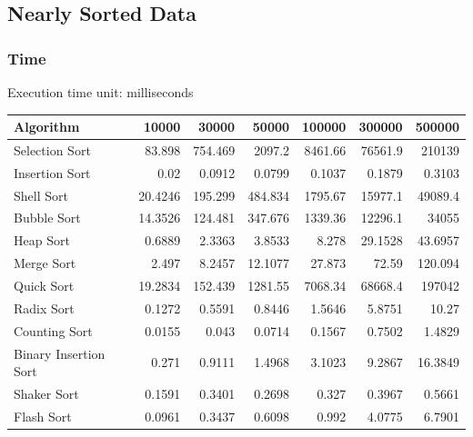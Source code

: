 \subsection{Nearly Sorted Data}
\subsubsection{Time}
Execution time unit: milliseconds
\begin{table}[h!]
\centering
\begin{tabular}{|l|r|r|r|r|r|r|}
\hline
\textbf{Algorithm} & \textbf{10000} & \textbf{30000} & \textbf{50000} & \textbf{100000} & \textbf{300000} & \textbf{500000} \\
\hline
Selection Sort & 83.898 & 754.469 & 2097.2 & 8461.66 & 76561.9 & 210139 \\ \hline
Insertion Sort & 0.02 & 0.0912 & 0.0799 & 0.1037 & 0.1879 & 0.3103 \\ \hline
Shell Sort & 20.4246 & 195.299 & 484.834 & 1795.67 & 15977.1 & 49089.4 \\ \hline
Bubble Sort & 14.3526 & 124.481 & 347.676 & 1339.36 & 12296.1 & 34055 \\ \hline
Heap Sort & 0.6889 & 2.3363 & 3.8533 & 8.278 & 29.1528 & 43.6957 \\ \hline
Merge Sort & 2.497 & 8.2457 & 12.1077 & 27.873 & 72.59 & 120.094 \\ \hline
Quick Sort & 19.2834 & 152.439 & 1281.55 & 7068.34 & 68668.4 & 197042 \\ \hline
Radix Sort & 0.1272 & 0.5591 & 0.8446 & 1.5646 & 5.8751 & 10.27 \\ \hline
Counting Sort & 0.0155 & 0.043 & 0.0714 & 0.1567 & 0.7502 & 1.4829 \\ \hline
Binary Insertion Sort & 0.271 & 0.9111 & 1.4968 & 3.1023 & 9.2867 & 16.3849 \\ \hline
Shaker Sort & 0.1591 & 0.3401 & 0.2698 & 0.327 & 0.3967 & 0.5661 \\ \hline
Flash Sort & 0.0961 & 0.3437 & 0.6098 & 0.992 & 4.0775 & 6.7901 \\
\hline
\end{tabular}
\label{table:nearly_sorted_execution_time}
\end{table}

